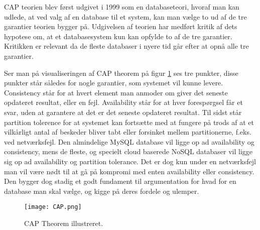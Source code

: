 CAP teorien blev først udgivet i 1999 som en databaseteori, hvoraf man kan udlede, 
at ved valg af en database til et system, kan man vælge to ud af de tre garantier teorien bygger på. 
Udgivelsen af teorien har medført kritik af dets hypotese om, 
at et databasesystem kun kan opfylde to af de tre garantier. 
Kritikken er relevant da de fleste databaser i nyere tid går efter at opnå alle tre garantier. \newline

Ser man på visualiseringen af CAP theorem på figur \ref{fig::CAP} ses tre punkter, 
disse punkter står således for nogle garantier, som systemet vil kunne levere. 
Consistency står for at hvert element man anmoder om giver det seneste opdateret resultat, eller en fejl. 
Availability står for at hver forespørgsel får et svar, uden at garantere at det er det seneste opdateret resultat. 
Til sidst står partition tolerence for at systemet kan fortsætte med at fungere på trods af at et vilkårligt antal 
af beskeder bliver tabt eller forsinket mellem partitionerne, f.eks. ved netværksfejl. 
Den almindelige MySQL database vil ligge op ad availability og consistency, mens de fleste, 
og specielt cloud baserede NoSQL databaser vil ligge sig op ad availability og partition tolerance. 
Det er dog kun under en netværksfejl man vil være nødt til at gå på kompromi med enten availability eller consistency. 
Den bygger dog stadig et godt fundament til argumentation for hvad for en database man skal vælge, 
og kigge på deres fordele og ulemper.

\begin{figure}
    \centering
    \texttt{[image: CAP.png]}
    \caption{CAP Theorem illustreret.}
    \label{fig::CAP}
\end{figure}

